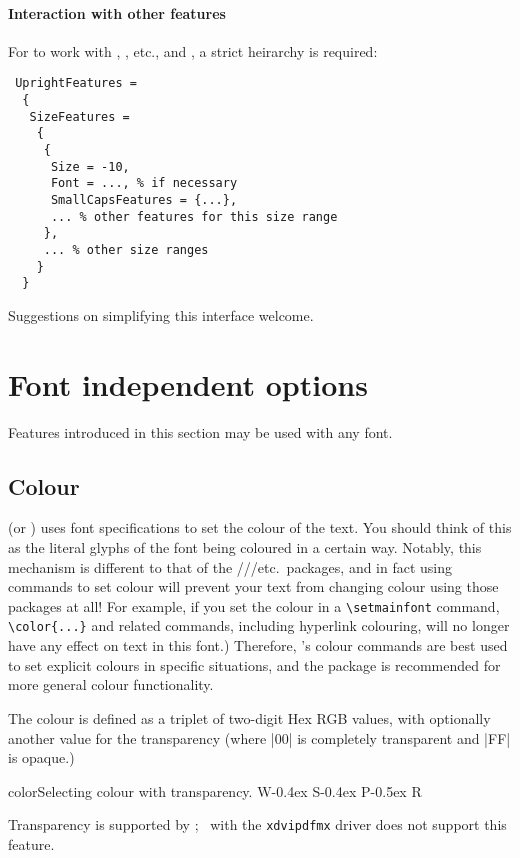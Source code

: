 \paragraph{Interaction with other features}
For  to work with , , etc., and , a strict heirarchy is required:
\begin{Verbatim}
 UprightFeatures =
  {
   SizeFeatures =
    {
     {
      Size = -10,
      Font = ..., % if necessary
      SmallCapsFeatures = {...},
      ... % other features for this size range
     },
     ... % other size ranges
    }
  }
\end{Verbatim}
Suggestions on simplifying this interface welcome.


\section{Font independent options}
\label{sec:font-ind-features}

Features introduced in this section may be used with any font.

\subsection{Colour}

 (or ) uses font specifications to set the colour of
the text.
You should think of this as the literal glyphs of the font being coloured in a certain way.
Notably, this mechanism is different to that of the ///etc.\ packages, and in fact using  commands to set colour will prevent your text from changing colour using those packages at all!
For example, if you set the colour in a \verb|\setmainfont| command, \verb|\color{...}| and related commands, including hyperlink colouring, will no longer have any effect on text in this font.)
Therefore, 's colour commands are best used to set explicit colours in specific situations, and the  package is recommended for more general colour functionality.

The colour is defined as a triplet of two-digit Hex RGB
values, with optionally another value for the transparency (where
|00| is completely transparent and |FF| is opaque.)
\begin{Lexample}{color}{Selecting colour with transparency.}
  \fontsize{48}{48}
  {W}\kern-0.4ex
  {S}\kern-0.4ex
  {P}\kern-0.5ex
  {R}
\end{Lexample}
Transparency is supported by \LuaLaTeX; \XeLaTeX\ with the \texttt{xdvipdfmx} driver
does not support this feature.

